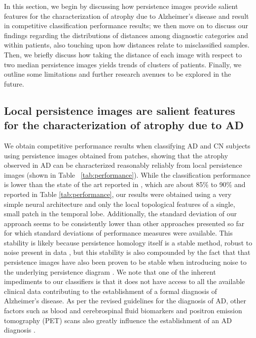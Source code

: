 \documentclass{article}
\begin{document}
In this section, we begin by discussing how persistence images provide salient features for the
characterization of atrophy due to Alzheimer's disease and result in competitive classification
performance results; we then move on to discuss our findings regarding the distributions of
distances among diagnostic categories and within patients, also touching upon how distances relate
to misclassified samples. Then, we briefly discuss how taking the distance of each image with
respect to two median persistence images yields trends of clusters of patients. Finally, we outline
some limitations and further research avenues to be explored in the future.

\subsection{Local persistence images are salient features for the characterization of atrophy due to AD }

We obtain competitive performance results when classifying AD and CN subjects using persistence
images obtained from patches, showing that the atrophy observed in AD can be characterized
reasonably reliably from local persistence images (shown in Table ~\ref{tab:performance}). While the
classification performance is lower than the state of the art reported in \citep{liu2018anatomical},
which are about 85\% to 90\% and reported in Table \ref{tab:performance}, our results were obtained
using a very simple neural architecture and only the local topological features of a single, small
patch in the temporal lobe. Additionally, the standard deviation of our approach seems to be
consistently lower than other approaches presented so far for which standard deviations of
performance measures were available. This stability is likely because persistence
homology itself is a stable method, robust to noise present in data \citep{cohen2007stability},
but this stability is also compounded by the fact that that persistence images have also been proven
to be stable when introducing noise to the underlying persistence diagram
\cite{adams2017persistence}. We note that one of the inherent impediments to our classifiers is that
it does not have access to all the available clinical data contributing to the establishment of
a formal diagnosis of Alzheimer's disease. As per the revised guidelines for the diagnosis of AD,
other factors such as blood and cerebrospinal fluid biomarkers and positron emission tomography
(PET) scans also greatly influence the establishment of an AD diagnosis \citep{mckhann2011diagnosis}. 
\end{document}
